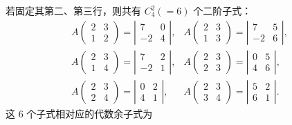 \documentclass[UTF8,12pt,a4paper,fontset=fandol]{ctexart}
\begin{document}
若固定其第二、第三行，则共有 $C_4^2(=6)$ 个二阶子式：
\[
\begin{array}{lll}
A\left(\begin{array}{cc}2&3\\1&2\end{array}\right)=
\left|\begin{array}{cc}7&0\\-2&4\end{array}\right|,
&
A\left(\begin{array}{cc}2&3\\1&3\end{array}\right)=
\left|\begin{array}{cc}7&5\\-2&6\end{array}\right|,
\\[1.2em]
A\left(\begin{array}{cc}2&3\\1&4\end{array}\right)=
\left|\begin{array}{cc}7&2\\-2&1\end{array}\right|,
&
A\left(\begin{array}{cc}2&3\\2&3\end{array}\right)=
\left|\begin{array}{cc}0&5\\4&6\end{array}\right|,
\\[1.2em]
A\left(\begin{array}{cc}2&3\\2&4\end{array}\right)=
\left|\begin{array}{cc}0&2\\4&1\end{array}\right|,
&
A\left(\begin{array}{cc}2&3\\3&4\end{array}\right)=
\left|\begin{array}{cc}5&2\\6&1\end{array}\right|.
\end{array}
\]
这 6 个子式相对应的代数余子式为
\end{document}
